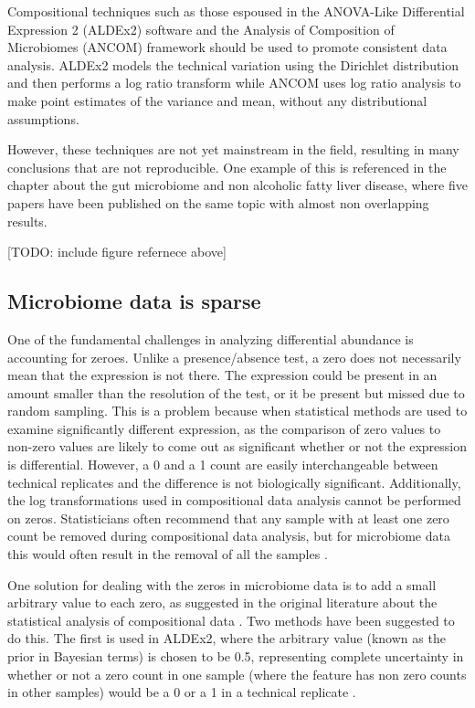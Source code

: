 Compositional techniques such as those espoused in the ANOVA-Like Differential Expression 2 (ALDEx2) software \cite{fernandes2014unifying} and the Analysis of Composition of Microbiomes (ANCOM) framework \cite{mandal2015analysis} should be used to promote consistent data analysis. ALDEx2 models the technical variation using the Dirichlet distribution and then performs a log ratio transform while ANCOM uses log ratio analysis to make point estimates of the variance and mean, without any distributional assumptions.

However, these techniques are not yet mainstream in the field, resulting in many conclusions that are not reproducible. One example of this is referenced in the chapter about the gut microbiome and non alcoholic fatty liver disease, where five papers have been published on the same topic with almost non overlapping results.

[TODO: include figure refernece above]

\subsection{Microbiome data is sparse}
One of the fundamental challenges in analyzing differential abundance is accounting for zeroes. Unlike a presence/absence test, a zero does not necessarily mean that the expression is not there. The expression could be present in an amount smaller than the resolution of the test, or it be present but missed due to random sampling. This is a problem because when statistical methods are used to examine significantly different expression, as the comparison of zero values to non-zero values are likely to come out as significant whether or not the expression is differential. However, a 0 and a 1 count are easily interchangeable between technical replicates and the difference is not biologically significant. Additionally, the log transformations used in compositional data analysis cannot be performed on zeros. Statisticians often recommend that any sample with at least one zero count be removed during compositional data analysis, but for microbiome data this would often result in the removal of all the samples \cite{aitchison1982statistical}.

One solution for dealing with the zeros in microbiome data is to add a small arbitrary value to each zero, as suggested in the original literature about the statistical analysis of compositional data \cite{aitchison1982statistical}. Two methods have been suggested to do this. The first is used in ALDEx2, where the arbitrary value (known as the prior in Bayesian terms) is chosen to be 0.5, representing complete uncertainty in whether or not a zero count in one sample (where the feature has non zero counts in other samples) would be a 0 or a 1 in a technical replicate \cite{fernandes2013anova}.

